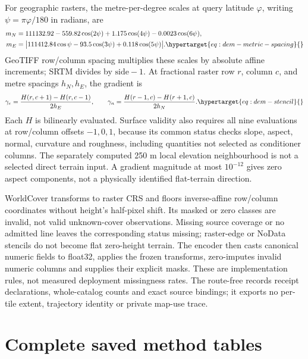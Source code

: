 For geographic rasters, the metre-per-degree scales at query latitude
\(\varphi\), writing \(\psi=\pi\varphi/180\) in radians, are
\begin{align}
 m_N&=111132.92-559.82\cos(2\psi)+1.175\cos(4\psi)
       -0.0023\cos(6\psi),\nonumber\\
 m_E&=\big|111412.84\cos\psi-93.5\cos(3\psi)
       +0.118\cos(5\psi)\big|.
 \label{eq:dem-metric-spacing}\hypertarget{eq:dem-metric-spacing}{}
\end{align}
GeoTIFF row/column spacing multiplies these scales by absolute affine
increments; SRTM divides by \(\mathrm{side}-1\). At fractional raster row
\(r\), column \(c\), and metre spacings \(h_N,h_E\), the gradient is
\begin{equation}
 \gamma_e=\frac{H(r,c+1)-H(r,c-1)}{2h_E},\qquad
 \gamma_n=\frac{H(r-1,c)-H(r+1,c)}{2h_N}.
 \label{eq:dem-stencil}\hypertarget{eq:dem-stencil}{}
\end{equation}
Each \(H\) is bilinearly evaluated. Surface validity also requires all
nine evaluations at row/column offsets \(-1,0,1\), because its common status
checks slope, aspect, normal, curvature and roughness, including quantities
not selected as conditioner columns. The separately computed 250 m local
elevation neighbourhood is not a selected direct terrain input. A gradient
magnitude at most \(10^{-12}\) gives zero aspect components, not a physically
identified flat-terrain direction.

WorldCover transforms to raster CRS and floors inverse-affine row/column
coordinates without height's half-pixel shift. Its masked or zero classes
are invalid, not valid unknown-cover observations. Missing source coverage
or no admitted line leaves the corresponding status missing; raster-edge or
NoData stencils do not become flat zero-height terrain. The encoder then
casts canonical numeric fields to float32, applies the frozen transforms,
zero-imputes invalid numeric columns and supplies their explicit masks.
These are implementation rules, not measured deployment missingness rates.
The route-free  records
receipt declarations, whole-catalog counts and exact source bindings; it
exports no per-tile extent, trajectory identity or private map-use trace.


\section{Complete saved method tables}



